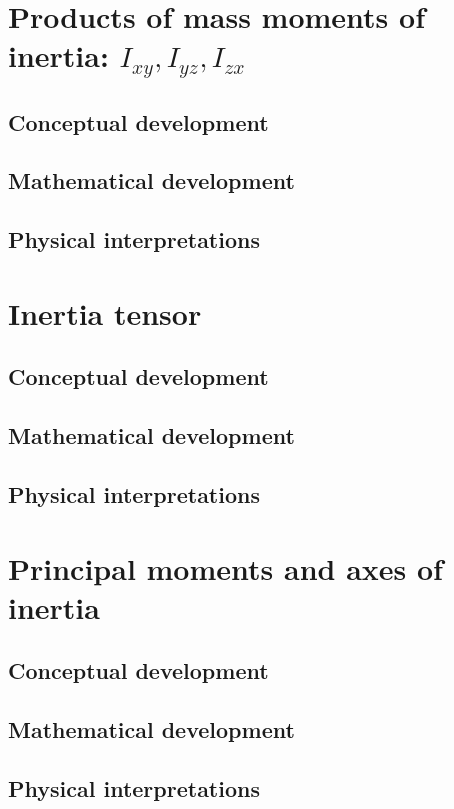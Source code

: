 \section{Products of mass moments of inertia: $I_{xy}, I_{yz}, I_{zx}$}
\subsection{Conceptual development}
\subsection{Mathematical development}
\subsection{Physical interpretations}

\section{Inertia tensor}
\subsection{Conceptual development}
\subsection{Mathematical development}
\subsection{Physical interpretations}

\section{Principal moments and axes of inertia}
\subsection{Conceptual development}
\subsection{Mathematical development}
\subsection{Physical interpretations}